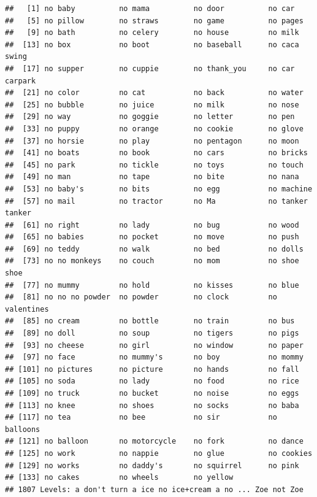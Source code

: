 \documentclass[man]{apa6}
\begin{document}
\begin{verbatim}
##   [1] no baby          no mama          no door          no car          
##   [5] no pillow        no straws        no game          no pages        
##   [9] no bath          no celery        no house         no milk         
##  [13] no box           no boot          no baseball      no caca swing   
##  [17] no supper        no cuppie        no thank_you     no car carpark  
##  [21] no color         no cat           no back          no water        
##  [25] no bubble        no juice         no milk          no nose         
##  [29] no way           no goggie        no letter        no pen          
##  [33] no puppy         no orange        no cookie        no glove        
##  [37] no horsie        no play          no pentagon      no moon         
##  [41] no boats         no book          no cars          no bricks       
##  [45] no park          no tickle        no toys          no touch        
##  [49] no man           no tape          no bite          no nana         
##  [53] no baby's        no bits          no egg           no machine      
##  [57] no mail          no tractor       no Ma            no tanker tanker
##  [61] no right         no lady          no bug           no wood         
##  [65] no babies        no pocket        no move          no push         
##  [69] no teddy         no walk          no bed           no dolls        
##  [73] no no monkeys    no couch         no mom           no shoe shoe    
##  [77] no mummy         no hold          no kisses        no blue         
##  [81] no no no powder  no powder        no clock         no valentines   
##  [85] no cream         no bottle        no train         no bus          
##  [89] no doll          no soup          no tigers        no pigs         
##  [93] no cheese        no girl          no window        no paper        
##  [97] no face          no mummy's       no boy           no mommy        
## [101] no pictures      no picture       no hands         no fall         
## [105] no soda          no lady          no food          no rice         
## [109] no truck         no bucket        no noise         no eggs         
## [113] no knee          no shoes         no socks         no baba         
## [117] no tea           no bee           no sir           no balloons     
## [121] no balloon       no motorcycle    no fork          no dance        
## [125] no work          no nappie        no glue          no cookies      
## [129] no works         no daddy's       no squirrel      no pink         
## [133] no cakes         no wheels        no yellow       
## 1807 Levels: a don't turn a ice no ice+cream a no ... Zoe not Zoe
\end{verbatim}
\end{document}
